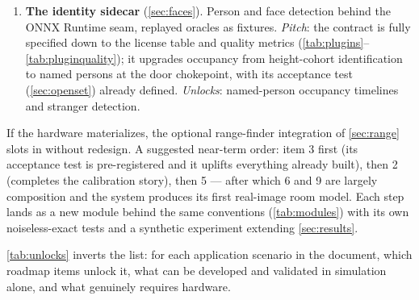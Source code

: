 \documentclass[11pt]{article}
\theoremstyle{definition}
\newcommand{\code}[1]{\texttt{#1}}
\begin{document}
\begin{enumerate}
$$        in \code{src/tsdf.c}; setup and run instructions are in the
        comment atop \code{mv/tsdf.h} (\code{make demo\_tsdf}; mesh
        lands in \code{out\_tsdf.ply}); validated in
        \autoref{tab:tsdfresults}. The voxel-major fast path is now
        built (\code{mv\_tsdf\_table\_build} /
        \code{mv\_tsdf\_fuse\_depthmap}): the per-voxel projection
        table of \autoref{sec:tsdf}, measured at \(\sim\)460M voxel
        visits/s --- 3.0\(\times\) the sample fold --- agreeing with
        the fold to 0.23 voxel RMS, carving included; and RANSAC
        plane extraction is built (\code{mv/plane.h}: seeded
        deterministic fit + greedy multi-plane extraction, normals to
        0.011\(^\circ\) under 29\% outliers). Remaining: the
        fixed-rig dense-depth producer (item 5) feeding both, and
        primitive fits beyond planes.
        \emph{Pitch}: every remaining piece rides on item 5 or 6;
        primitives (\autoref{sec:ladder}) then give the furniture-level
        scene description almost for free. \emph{Unlocks}: continuous
        room-model maintenance and geometric change detection as a
        standing application beside the \autoref{sec:scenarios}
        trackers.
  \item \textbf{The identity sidecar} (\autoref{sec:faces}). Person and
        face detection behind the ONNX Runtime seam, replayed oracles as
        fixtures. \emph{Pitch}: the contract is fully specified down to
        the license table and quality metrics
        (\autoref{tab:plugins}--\autoref{tab:pluginquality}); it
        upgrades occupancy from height-cohort identification to named
        persons at the door chokepoint, with its acceptance test
        (\autoref{sec:openset}) already defined. \emph{Unlocks}:
        named-person occupancy timelines and stranger detection.
\end{enumerate}

If the hardware materializes, the optional range-finder integration of
\autoref{sec:range} slots in without redesign. A suggested near-term
order: item 3 first (its acceptance test is pre-registered and it
uplifts everything already built), then 2 (completes the calibration
story), then 5 --- after which 6 and 9 are largely composition and the
system produces its first real-image room model. Each step lands as a
new module behind the same conventions (\autoref{tab:modules}) with its
own noiseless-exact tests and a synthetic experiment extending
\autoref{sec:results}.

\autoref{tab:unlocks} inverts the list: for each application scenario in
the document, which roadmap items unlock it, what can be developed and
validated in simulation alone, and what genuinely requires hardware.
\end{document}
